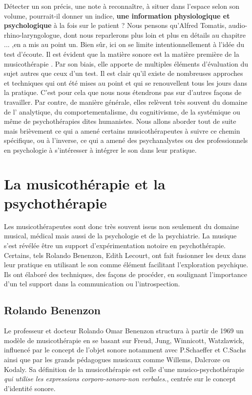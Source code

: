  
 Détecter un son précis, une note à reconnaître,  à situer dans l'espace selon son volume,  pourrait-il donner   un indice, \textbf{une information physiologique et psychologique} à la fois sur le patient ? Nous pensons qu'Alfred Tomatis, audio-rhino-laryngologue, dont nous reparlerons plus loin et plus en détails au chapitre ... ,en a mis au point un. 
 Bien sûr, ici on se limite intentionnellement à l'idée du test d'écoute. Il est évident que la matière sonore est la matière première de la  musicothérapie . Par son biais, elle  apporte de multiples éléments d'évaluation du sujet  autres que ceux d'un test. Il est clair qu'il existe de nombreuses approches et techniques qui ont été mises au point  et qui se renouvellent tous les jours dans la pratique. C'est pour cela que nous nous étendrons pas sur d'autres façons de travailler. Par contre, de manière générale, elles relèvent très souvent du domaine de l' analytique, du comportementalisme, du cognitivisme, de la  systémique ou même de psychothérapies dites humanistes. Nous allons aborder tout de suite mais brièvement ce qui a amené certains musicothérapeutes à suivre ce chemin spécifique, ou à  l'inverse, ce qui a amené des psychanalystes ou des professionnels en psychologie à s'intéresser à intégrer le son dans leur pratique.
 
 
 
\section{La musicothérapie et la psychothérapie}
\label{musicothEtpsycho}

	 Les musicothérapeutes sont donc très souvent  issus non seulement du domaine musical, médical mais aussi  de  la psychologie et de la psychiatrie. La musique s'est révélée être  un support d'expérimentation notoire en psychothérapie. Certains, tels Rolando Benenzon, Edith Lecourt,  ont fait fusionner les deux dans leur pratique  en utilisant le son comme élément facilitant l'exploration psychique. Ils ont élaboré des techniques, des façons de procéder, en soulignant l'importance d'un tel support dans la  communication ou l'introspection.
	 
	  \subsection{Rolando Benenzon} Le professeur et docteur Rolando Omar Benenzon structura à partir de 1969 un modèle de musicothérapie en se basant sur Freud, Jung, Winnicott, Watzlawick, influencé par le concept de l'objet sonore notamment avec P.Schaeffer et C.Sachs ainsi que par les grands pédagogues musicaux comme Willems, Dalcroze ou Kodaly. Sa définition de la musicothérapie est celle d'une musico-psychothérapie  \emph{\textsl{qui utilise les expressions corporo-sonoro-non verbales.}}, centrée sur le concept d'identité sonore.

